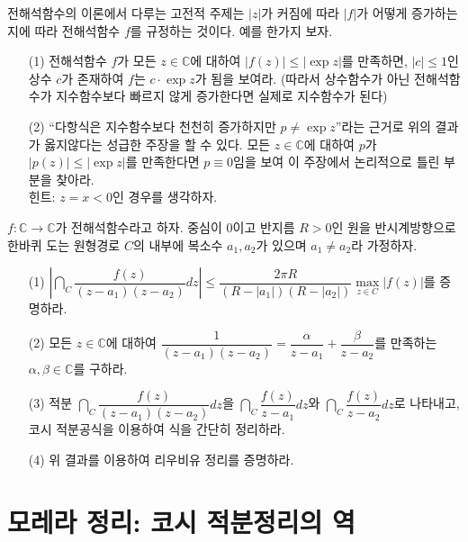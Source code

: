 \begin{salt_exercise} \label{ex-3-33}
전해석함수의 이론에서 다루는 고전적 주제는
$|z|$가 커짐에 따라 $|f|$가 어떻게 증가하는지에 따라 전해석함수 $f$를 규정하는 것이다.
예를 한가지 보자.
\begin{itemize}
\item[(1)] 전해석함수 $f$가 모든 $z\in\mathbb C$에 대하여 
$|f(z)| \le |\exp z|$를 만족하면, 
$|c|\le1$인 상수 $c$가 존재하여 $f$는 $c\cdot \exp z$가 됨을 보여라.
(따라서 상수함수가 아닌 전해석함수가 지수함수보다 빠르지 않게 증가한다면
실제로 지수함수가 된다)
\item[(2)] ``다항식은 지수함수보다 천천히 증가하지만 $p\ne \exp z$''라는 근거로
위의 결과가 옳지않다는 성급한 주장을 할 수 있다.
모든 $z\in\mathbb C$에 대하여 $p$가 $|p(z)|\le |\exp z|$를 만족한다면
$p\equiv0$임을 보여 이 주장에서 논리적으로 틀린 부분을 찾아라. \\
힌트: $z=x<0$인 경우를 생각하자.
\end{itemize}
\end{salt_exercise}

\begin{salt_exercise} \label{ex-3-34}
$f:\mathbb C \to \mathbb C$가 전해석함수라고 하자.
중심이 $0$이고 반지름 $R>0$인 원을 반시계방향으로 한바퀴 도는 원형경로 $C$의
내부에 복소수 $a_1, a_2$가 있으며 $a_1\ne a_2$라 가정하자.
\begin{itemize}
\item[(1)] $\left| \dint_C \dfrac{f(z)}{(z-a_1)(z-a_2)}dz \right| \le
\dfrac{2\pi R}{(R-|a_1|)(R-|a_2|)} \max\limits_{z\in C} |f(z)|$를 증명하라.
\item[(2)] 모든 $z\in \mathbb C$에 대하여
$\dfrac1{(z-a_1)(z-a_2)} = \dfrac\alpha{z-a_1} + \dfrac\beta{z-a_2}$를 만족하는
$\alpha, \beta \in \mathbb C$를 구하라.
\item[(3)] 적분 $\dint_C \dfrac{f(z)}{(z-a_1)(z-a_2)}dz$을
$\dint_C \dfrac{f(z)}{z-a_1}dz$와 $\dint_C \dfrac{f(z)}{z-a_2}dz$로 나타내고,
코시 적분공식을 이용하여 식을 간단히 정리하라.
\item[(4)] 위 결과를 이용하여 리우비유 정리를 증명하라.
\end{itemize}
\end{salt_exercise}

\section{모레라 정리: 코시 적분정리의 역}

